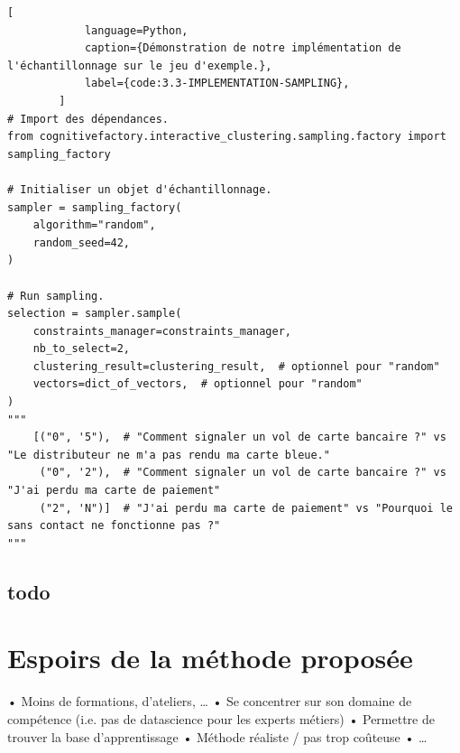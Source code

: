 		\begin{lstlisting}[
			language=Python,
			caption={Démonstration de notre implémentation de l'échantillonnage sur le jeu d'exemple.},
			label={code:3.3-IMPLEMENTATION-SAMPLING},
		]
# Import des dépendances.
from cognitivefactory.interactive_clustering.sampling.factory import sampling_factory

# Initialiser un objet d'échantillonnage.
sampler = sampling_factory(
	algorithm="random",
	random_seed=42,
)

# Run sampling.
selection = sampler.sample(
	constraints_manager=constraints_manager,
	nb_to_select=2,
	clustering_result=clustering_result,  # optionnel pour "random"
	vectors=dict_of_vectors,  # optionnel pour "random"
)
"""
	[("0", '5"),  # "Comment signaler un vol de carte bancaire ?" vs "Le distributeur ne m'a pas rendu ma carte bleue."
	 ("0", '2"),  # "Comment signaler un vol de carte bancaire ?" vs "J'ai perdu ma carte de paiement"
	 ("2", 'N")]  # "J'ai perdu ma carte de paiement" vs "Pourquoi le sans contact ne fonctionne pas ?"
"""
		\end{lstlisting}
		

		\subsection{todo}

	
	\section{Espoirs de la méthode proposée}

		•	Moins de formations, d’ateliers, …
		•	Se concentrer sur son domaine de compétence (i.e. pas de datascience pour les experts métiers)
		•	Permettre de trouver la base d’apprentissage
		•	Méthode réaliste / pas trop coûteuse
		•	…
